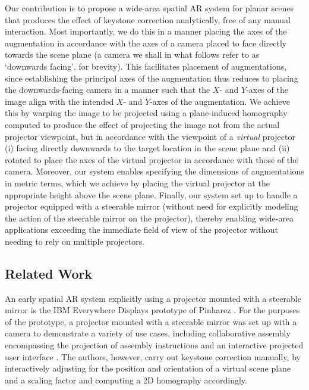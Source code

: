 \documentclass[review]{elsarticle}
\begin{document}
Our contribution is to propose a wide-area spatial AR system for planar scenes that produces the effect of keystone correction analytically, free of any manual interaction. Most importantly, we do this in a manner placing the axes of the augmentation in accordance with the axes of a camera placed to face directly towards the scene plane (a camera we shall in what follows refer to as `downwards facing', for brevity). This facilitates placement of augmentations, since establishing the principal axes of the augmentation thus reduces to placing the downwards-facing camera in a manner such that the $X$- and $Y$-axes of the image align with the intended $X$- and $Y$-axes of the augmentation. We achieve this by warping the image to be projected using a plane-induced homography computed to produce the effect of projecting the image not from the actual projector viewpoint, but in accordance with the viewpoint of a \textit{virtual} projector (i) facing directly downwards to the target location in the scene plane and (ii) rotated to place the axes of the virtual projector in accordance with those of the camera. Moreover, our system enables specifying the dimensions of augmentations in metric terms, which we achieve by placing the virtual projector at the appropriate height above the scene plane. Finally, our system set up to handle a projector equipped with a steerable mirror (without need for explicitly modeling the action of the steerable mirror on the projector), thereby enabling wide-area applications exceeding the immediate field of view of the projector without needing to rely on multiple projectors.

\subsection{Related Work}

An early spatial AR system explicitly using a projector mounted with a steerable mirror is the IBM Everywhere Displays prototype of Pinharez \cite{pinhanez2001everywhere}. For the purposes of the prototype, a projector mounted with a steerable mirror was set up with a camera to demonstrate a variety of use cases, including collaborative assembly encompassing the projection of assembly instructions and an interactive projected user interface \cite{kjeldsen2002interacting,pinhanez2003applications}. The authors, however, carry out keystone correction manually, by interactively adjusting for the position and orientation of a virtual scene plane and a scaling factor and computing a 2D homography accordingly. %
\end{document}

